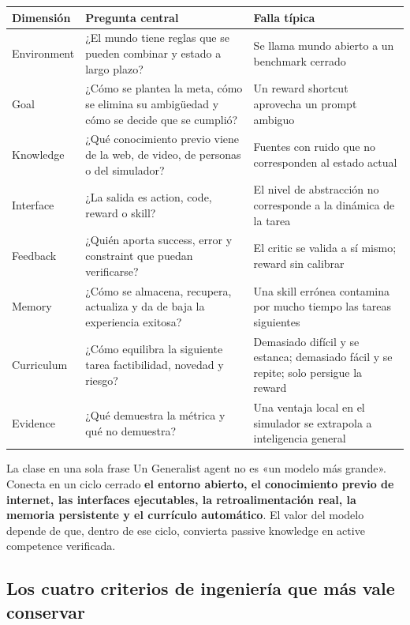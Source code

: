 \documentclass[a4paper]{article}
\begin{document}
\begin{longtable}{@{}L{0.18\textwidth}L{0.34\textwidth}L{0.36\textwidth}@{}}
\toprule
Dimensión & Pregunta central & Falla típica \\
\midrule
Environment & ¿El mundo tiene reglas que se pueden combinar y estado a largo plazo? & Se llama mundo abierto a un benchmark cerrado \\
Goal & ¿Cómo se plantea la meta, cómo se elimina su ambigüedad y cómo se decide que se cumplió? & Un reward shortcut aprovecha un prompt ambiguo \\
Knowledge & ¿Qué conocimiento previo viene de la web, de video, de personas o del simulador? & Fuentes con ruido que no corresponden al estado actual \\
Interface & ¿La salida es action, code, reward o skill? & El nivel de abstracción no corresponde a la dinámica de la tarea \\
Feedback & ¿Quién aporta success, error y constraint que puedan verificarse? & El critic se valida a sí mismo; reward sin calibrar \\
Memory & ¿Cómo se almacena, recupera, actualiza y da de baja la experiencia exitosa? & Una skill errónea contamina por mucho tiempo las tareas siguientes \\
Curriculum & ¿Cómo equilibra la siguiente tarea factibilidad, novedad y riesgo? & Demasiado difícil y se estanca; demasiado fácil y se repite; solo persigue la reward \\
Evidence & ¿Qué demuestra la métrica y qué no demuestra? & Una ventaja local en el simulador se extrapola a inteligencia general \\
\bottomrule
\end{longtable}

\begin{importantbox}{La clase en una sola frase}
Un Generalist agent no es «un modelo más grande». Conecta en un ciclo cerrado \textbf{el entorno abierto, el conocimiento previo de internet, las interfaces ejecutables, la retroalimentación real, la memoria persistente y el currículo automático}. El valor del modelo depende de que, dentro de ese ciclo, convierta passive knowledge en active competence verificada.
\end{importantbox}

\subsection{Los cuatro criterios de ingeniería que más vale conservar}
\end{document}
